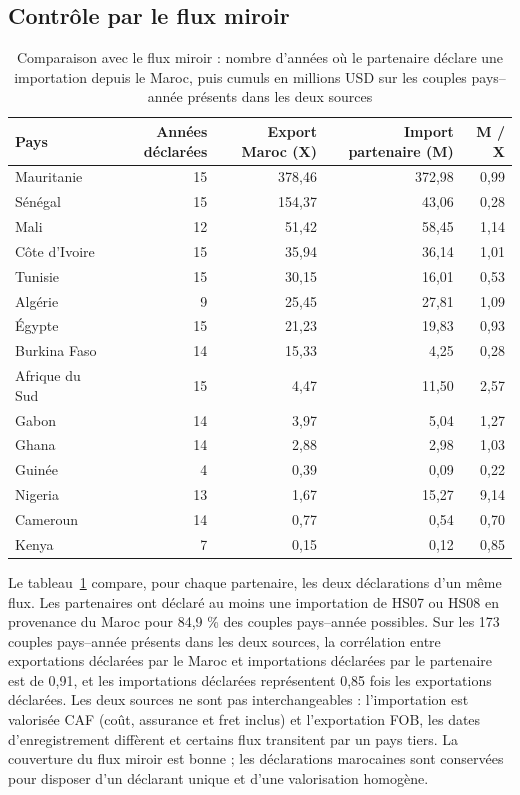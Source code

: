 \documentclass[11pt,a4paper]{article}
\begin{document}
\subsection{Contrôle par le flux miroir}\label{sec:miroir}
\begin{table}[H]\centering\small
\caption{Comparaison avec le flux miroir : nombre d'années où le partenaire déclare une importation depuis le Maroc, puis cumuls en millions USD sur les couples pays--année présents dans les deux sources}\label{tab:miroir}
\begin{tabular}{lrrrr}\toprule
Pays & Années déclarées & Export Maroc (X) & Import partenaire (M) & M / X \\ \midrule
Mauritanie & 15 & 378,46 & 372,98 & 0,99 \\
Sénégal & 15 & 154,37 & 43,06 & 0,28 \\
Mali & 12 & 51,42 & 58,45 & 1,14 \\
Côte d'Ivoire & 15 & 35,94 & 36,14 & 1,01 \\
Tunisie & 15 & 30,15 & 16,01 & 0,53 \\
Algérie & 9 & 25,45 & 27,81 & 1,09 \\
Égypte & 15 & 21,23 & 19,83 & 0,93 \\
Burkina Faso & 14 & 15,33 & 4,25 & 0,28 \\
Afrique du Sud & 15 & 4,47 & 11,50 & 2,57 \\
Gabon & 14 & 3,97 & 5,04 & 1,27 \\
Ghana & 14 & 2,88 & 2,98 & 1,03 \\
Guinée & 4 & 0,39 & 0,09 & 0,22 \\
Nigeria & 13 & 1,67 & 15,27 & 9,14 \\
Cameroun & 14 & 0,77 & 0,54 & 0,70 \\
Kenya & 7 & 0,15 & 0,12 & 0,85 \\
\bottomrule\end{tabular}
\end{table}
Le tableau~\ref{tab:miroir} compare, pour chaque partenaire, les deux déclarations d'un même flux. Les partenaires ont déclaré au moins une importation de HS07 ou HS08 en provenance du Maroc pour 84,9 \% des couples pays–année possibles. Sur les 173 couples pays–année présents dans les deux sources, la corrélation entre exportations déclarées par le Maroc et importations déclarées par le partenaire est de 0,91, et les importations déclarées représentent 0,85 fois les exportations déclarées. Les deux sources ne sont pas interchangeables : l'importation est valorisée CAF (coût, assurance et fret inclus) et l'exportation FOB, les dates d'enregistrement diffèrent et certains flux transitent par un pays tiers. La couverture du flux miroir est bonne ; les déclarations marocaines sont conservées pour disposer d'un déclarant unique et d'une valorisation homogène.
\end{document}
